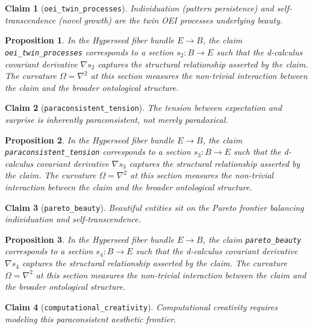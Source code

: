 \documentclass{article}
\newtheorem{claim}{Claim}
\newtheorem{proposition}{Proposition}
\begin{document}
\begin{claim}[\texttt{oei_twin_processes}]
Individuation (pattern persistence) and self-transcendence (novel growth) are the twin OEI processes underlying beauty.
\end{claim}

\begin{proposition}
In the Hyperseed fiber bundle $E \to B$, the claim \texttt{oei_twin_processes} corresponds to a section $s_2: B \to E$ such that the d-calculus covariant derivative $\nabla s_2$ captures the structural relationship asserted by the claim. The curvature $\Omega = \nabla^2$ at this section measures the non-trivial interaction between the claim and the broader ontological structure.
\end{proposition}

\begin{claim}[\texttt{paraconsistent_tension}]
The tension between expectation and surprise is inherently paraconsistent, not merely paradoxical.
\end{claim}

\begin{proposition}
In the Hyperseed fiber bundle $E \to B$, the claim \texttt{paraconsistent_tension} corresponds to a section $s_3: B \to E$ such that the d-calculus covariant derivative $\nabla s_3$ captures the structural relationship asserted by the claim. The curvature $\Omega = \nabla^2$ at this section measures the non-trivial interaction between the claim and the broader ontological structure.
\end{proposition}

\begin{claim}[\texttt{pareto_beauty}]
Beautiful entities sit on the Pareto frontier balancing individuation and self-transcendence.
\end{claim}

\begin{proposition}
In the Hyperseed fiber bundle $E \to B$, the claim \texttt{pareto_beauty} corresponds to a section $s_4: B \to E$ such that the d-calculus covariant derivative $\nabla s_4$ captures the structural relationship asserted by the claim. The curvature $\Omega = \nabla^2$ at this section measures the non-trivial interaction between the claim and the broader ontological structure.
\end{proposition}

\begin{claim}[\texttt{computational_creativity}]
Computational creativity requires modeling this paraconsistent aesthetic frontier.
\end{claim}
\end{document}
